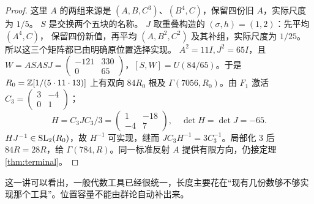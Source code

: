 \begin{proof}
这里 $A$ 的两组来源是 $(A,B,C^3)$、$(B^4,C)$，保留四份旧 $A$，实际尺度为 $1/5$。
$S$ 是交换两个五块的名称。
$J$ 取重叠构造的 $(\sigma,h)=(1,2)$：先平均 $(A^4,C)$，
保留四份新值，再平均 $(A,B^2,C^2)$ 及其补组，实际尺度为 $1/25$。
所以这三个矩阵都已由明确原位置选择实现。
$A^2=11I,J^2=65I$，且 $W=ASASJ=\left(\begin{smallmatrix}-121&330\\0&65\end{smallmatrix}\right)$，$[S,W]=U(84/65)$。于是 $R_0=\mathbb Z[1/(5\cdot11\cdot13)]$ 上有双向 $84R_0$ 根及 $\Gamma(7056,R_0)$。由 $F_1$ 激活 $C_3=\left(\begin{smallmatrix}3&-4\\0&1\end{smallmatrix}\right)$；
\[
H=C_3JC_3/3=\begin{pmatrix}1&-18\\-4&7\end{pmatrix},\quad
\det H=\det J=-65.
\]
$HJ^{-1}\in\operatorname{SL}_2(R_0)$，故 $H^{-1}$ 可实现，继而 $JC_3H^{-1}=3C_3^{-1}$。局部化 $3$ 后 $84R=28R$，给 $\Gamma(784,R)$。同一标准反射 $A$ 提供有限方向，仍接定理\ref{thm:terminal}。
\end{proof}
这一讲可以看出，一般代数工具已经很统一，长度主要花在“现有几份数够不够实现那个工具”。位置容量不能由群论自动补出来。
